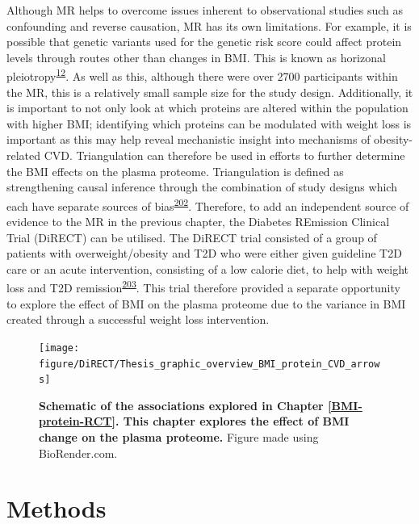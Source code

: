 \documentclass[11pt,twoside]{bristolthesis}
\begin{document}
Although MR helps to overcome issues inherent to observational studies such as confounding and reverse causation, MR has its own limitations. For example, it is possible that genetic variants used for the genetic risk score could affect protein levels through routes other than changes in BMI. This is known as horizonal pleiotropy\textsuperscript{\protect\hyperlink{ref-Davies2018}{12}}. As well as this, although there were over 2700 participants within the MR, this is a relatively small sample size for the study design. Additionally, it is important to not only look at which proteins are altered within the population with higher BMI; identifying which proteins can be modulated with weight loss is important as this may help reveal mechanistic insight into mechanisms of obesity-related CVD. Triangulation can therefore be used in efforts to further determine the BMI effects on the plasma proteome. Triangulation is defined as strengthening causal inference through the combination of study designs which each have separate sources of bias\textsuperscript{\protect\hyperlink{ref-Lawlor2016}{202}}. Therefore, to add an independent source of evidence to the MR in the previous chapter, the Diabetes REmission Clinical Trial (DiRECT) can be utilised. The DiRECT trial consisted of a group of patients with overweight/obesity and T2D who were either given guideline T2D care or an acute intervention, consisting of a low calorie diet, to help with weight loss and T2D remission\textsuperscript{\protect\hyperlink{ref-Lean2018}{203}}. This trial therefore provided a separate opportunity to explore the effect of BMI on the plasma proteome due to the variance in BMI created through a successful weight loss intervention.



\begin{figure}

{\centering \texttt{[image: figure/DiRECT/Thesis\_graphic\_overview\_BMI\_protein\_CVD\_arrows]} 

}

\caption[Schematic of the associations explored in Chapter \ref{BMI-protein-RCT}]{\textbf{Schematic of the associations explored in Chapter \ref{BMI-protein-RCT}. This chapter explores the effect of BMI change on the plasma proteome.} Figure made using BioRender.com.}\label{fig:BMI-protein-graphic2}
\end{figure}
\hypertarget{methods-3}{%
\section{Methods}\label{methods-3}}
\end{document}
